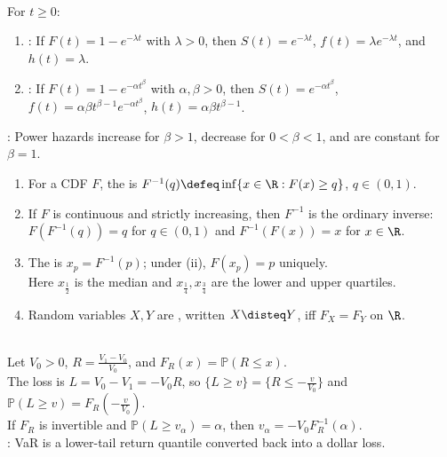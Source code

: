 \begin{example} \label{ex:exponential-and-weibull-hazards} \\
For $t\geq0$:
\begin{enumerate}[label=(\roman*)]
\setlength{\itemsep}{0pt}
\item {}: If $F(t)=1-e^{-\lambda t}$ with $\lambda>0$, then $S(t)=e^{-\lambda t}$, $f(t)=\lambda e^{-\lambda t}$, and $h(t)=\lambda$.
\item {}: If $F(t)=1-e^{-\alpha t^\beta}$ with $\alpha,\beta>0$, then $S(t)=e^{-\alpha t^\beta}$, $f(t)=\alpha\beta t^{\beta-1}e^{-\alpha t^\beta}$, $h(t)=\alpha\beta t^{\beta-1}$.
\end{enumerate}
: Power hazards increase for $\beta>1$, decrease for $0<\beta<1$, and are constant for $\beta=1$.
\end{example}

\begin{definition} \label{def:quantile-and-equality-in-distribution} 
\begin{enumerate}[label=(\roman*)]
\setlength{\itemsep}{0pt}
\item For a CDF $F$, the  is $F^{-1}(q)\defeq\inf\{x\in\R:F(x)\geq q\}$, $q\in(0,1)$.
\item If $F$ is continuous and strictly increasing, then $F^{-1}$ is the ordinary inverse:\\
$F(F^{-1}(q))=q$ for $q\in(0,1)$ and $F^{-1}(F(x))=x$ for $x\in\R$.
\item The  is $x_p=F^{-1}(p)$; under (ii), $F(x_p)=p$ uniquely.\\
Here $x_{\frac{1}{2}}$ is the median and $x_{\frac{1}{4}},x_{\frac{3}{4}}$ are the lower and upper quartiles.
\item Random variables $X,Y$ are , written $X\disteq Y$, iff $F_X=F_Y$ on $\R$.
\end{enumerate}
\end{definition}

\begin{example} \label{ex:value-at-risk-as-quantile} \\
Let $V_0>0$, $R=\frac{V_1-V_0}{V_0}$, and $F_R(x)=\mathbb{P}(R\leq x)$.\\
The loss is $L=V_0-V_1=-V_0R$, so $\{L\geq v\}=\{R\leq -\frac{v}{V_0}\}$ and $\mathbb{P}(L\geq v)=F_R(-\frac{v}{V_0})$.\\
If $F_R$ is invertible and $\mathbb{P}(L\geq v_\alpha)=\alpha$, then $v_\alpha=-V_0F_R^{-1}(\alpha)$.\\
: VaR is a lower-tail return quantile converted back into a dollar loss.
\end{example}

